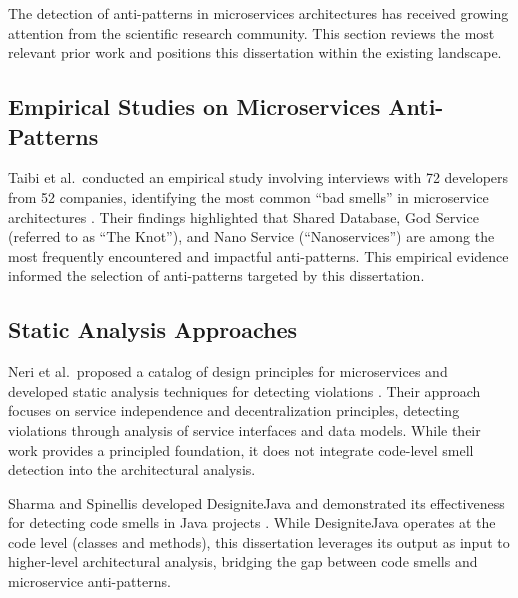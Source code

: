 \indent \par The detection of anti-patterns in microservices architectures has received growing attention from the scientific research community. This section reviews the most relevant prior work and positions this dissertation within the existing landscape.

\subsection{Empirical Studies on Microservices Anti-Patterns}
\label{subsec:empirical-studies}

\indent \par \indent\par Taibi et al.\ conducted an empirical study involving interviews with 72 developers from 52 companies, identifying the most common ``bad smells'' in microservice architectures \cite{Taibi2018}. Their findings highlighted that Shared Database, God Service (referred to as ``The Knot''), and Nano Service (``Nanoservices'') are among the most frequently encountered and impactful anti-patterns. This empirical evidence informed the selection of anti-patterns targeted by this dissertation.

             \subsection{Static Analysis Approaches}
             \label{subsec:related-static}

             \indent\par Neri et al.\ proposed a catalog of design principles for microservices and developed static analysis techniques for detecting violations \cite{Neri2020}. Their approach focuses on service independence and decentralization principles, detecting violations through analysis of service interfaces and data models. While their work provides a principled foundation, it does not integrate code-level smell detection into the architectural analysis.

             Sharma and Spinellis developed DesigniteJava and demonstrated its effectiveness for detecting code smells in Java projects \cite{Sharma2018}. While DesigniteJava operates at the code level (classes and methods), this dissertation leverages its output as input to higher-level architectural analysis, bridging the gap between code smells and microservice anti-patterns.

